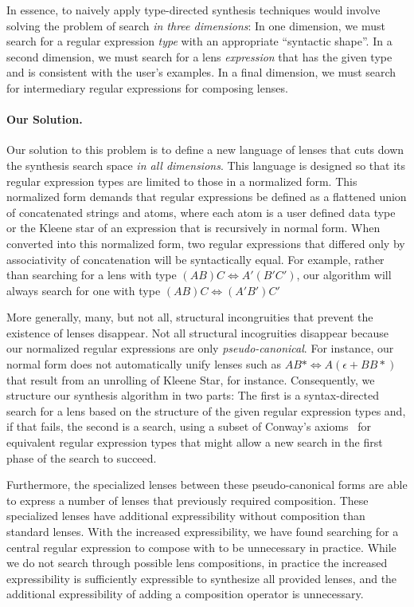 \documentclass[numbers]{sigplanconf}
\begin{document}
In essence, to naively apply type-directed synthesis techniques would involve
solving the problem of search \emph{in three dimensions}:  In one
dimension, we must search for a regular expression \emph{type}
with an appropriate ``syntactic shape''.  In a second dimension,
we must search for a lens \emph{expression} that has the given type and
is consistent with the user's examples.  In a final dimension, we must search
for intermediary regular expressions for composing lenses.

\paragraph*{Our Solution.}  Our solution to this problem is to define
a new language of lenses that
cuts down the synthesis search space \emph{in all dimensions}.
This language is designed so that its regular expression types are limited 
to those in a normalized form.  This normalized form
demands that regular expressions be defined as a flattened 
union of concatenated strings and atoms, where each atom is a user defined data
type or the Kleene star of an expression that is recursively in normal form.
When converted into this normalized form, two regular expressions that 
differed only by associativity of concatenation will be syntactically equal.
For example, rather than searching for a lens with type 
$(A B) C \Leftrightarrow A' (B' C')$, our algorithm will always search
for one with type  $(A B) C \Leftrightarrow (A' B') C'$

More generally, many, but not all, structural incongruities that
prevent the existence of lenses disappear.
Not all structural incogruities disappear because our normalized regular expressions
are only \emph{pseudo-canonical}.  For instance, our normal form
does not automatically unify lenses such as
$A B* \Leftrightarrow A (\epsilon + BB*)$ that result from an
unrolling of Kleene Star, for instance.
Consequently, we structure our synthesis algorithm in two parts:  The
first is a syntax-directed search for a lens based on the structure of the given
regular expression types and, if that fails, the second is a search,
using a subset of Conway's axioms~\cite{conway} for 
equivalent regular expression types that might allow a new search
in the first phase of the search to succeed.

Furthermore, the specialized lenses between these pseudo-canonical forms are able to express
a number of lenses that previously required composition.
These specialized lenses have additional expressibility without composition than
standard lenses.
With the
increased expressibility, we have found searching for a central regular
expression to compose with to be unnecessary in practice.
While we do not search through possible lens compositions,
in practice the increased expressibility is sufficiently expressible to
synthesize all provided lenses, and the additional expressibility of adding a
composition operator is unnecessary.
\end{document}

